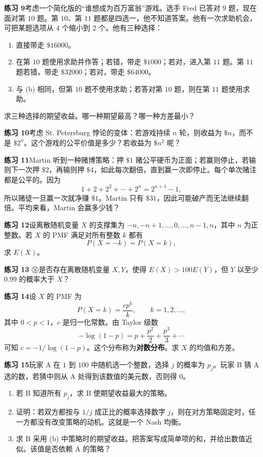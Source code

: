 \documentclass[UTF8, 12pt, fontset=fandol, oneside]{ctexart}
\begin{document}
\noindent\textbf{练习 9}\quad 考虑一个简化版的“谁想成为百万富翁”游戏。选手 Fred 已答对 $9$ 题，现在面对第 $10$ 题。第 $10$、第 $11$ 题都是四选一，他不知道答案。他有一次求助机会，可把某题选项从 $4$ 个缩小到 $2$ 个。他有三种选择：
\begin{enumerate}
  \item[(a)] 直接带走 $\$16000$。
  \item[(b)] 在第 $10$ 题使用求助并作答；若错，带走 $\$1000$；若对，进入第 $11$ 题。第 $11$ 题若错，带走 $\$32000$；若对，带走 $\$64000$。
  \item[(c)] 与 (b) 相同，但第 $10$ 题不使用求助；若答对第 $10$ 题，则在第 $11$ 题使用求助。
\end{enumerate}
求三种选择的期望收益。哪一种期望最高？哪一种方差最小？

\noindent\textbf{练习 10}\quad 考虑 St. Petersburg 悖论的变体：若游戏持续 $n$ 轮，则收益为 $\$n$，而不是 $\$2^n$。这个游戏的公平价值是多少？若收益为 $\$n^2$ 呢？

\noindent\textbf{练习 11}\quad Martin 听到一种赌博策略：押 $\$1$ 赌公平硬币为正面；若赢则停止，若输则下一次押 $\$2$，再输则押 $\$4$，如此每次翻倍，直到赢一次即停止。每个单次赌注都是公平的。因为
\[
  1+2+2^2+\cdots+2^n=2^{n+1}-1,
\]
所以赌徒一旦赢一次就净赚 $\$1$。Martin 只有 $\$31$，因此可能破产而无法继续翻倍。平均来看，Martin 会赢多少钱？

\noindent\textbf{练习 12}\quad 设离散随机变量 $X$ 的支撑集为 $-n,-n+1,\ldots,0,\ldots,n-1,n$，其中 $n$ 为正整数。若 $X$ 的 PMF 满足对所有整数 $k$ 都有
\[
  P(X=-k)=P(X=k),
\]
求 $E(X)$。

\noindent\textbf{练习 13 $\circledS$}\quad 是否存在离散随机变量 $X,Y$，使得 $E(X)>100E(Y)$，但 $Y$ 以至少 $0.99$ 的概率大于 $X$？

\noindent\textbf{练习 14}\quad 设 $X$ 的 PMF 为
\[
  P(X=k)=\frac{cp^k}{k},\qquad k=1,2,\ldots,
\]
其中 $0<p<1$，$c$ 是归一化常数。由 Taylor 级数
\[
  -\log(1-p)=p+\frac{p^2}{2}+\frac{p^3}{3}+\cdots
\]
可知 $c=-1/\log(1-p)$。这个分布称为\textbf{对数分布}。求 $X$ 的均值和方差。

\noindent\textbf{练习 15}\quad 玩家 A 在 $1$ 到 $100$ 中随机选一个整数，选择 $j$ 的概率为 $p_j$。玩家 B 猜 A 选的数，若猜中则从 A 处得到该数值的美元数，否则得 $0$。
\begin{enumerate}
  \item[(a)] 若 B 知道所有 $p_j$，求 B 使期望收益最大的策略。
  \item[(b)] 证明：若双方都按与 $1/j$ 成正比的概率选择数字 $j$，则在对方策略固定时，任一方都没有改变策略的动机。这就是一个 Nash 均衡。
  \item[(c)] 求 B 采用 (b) 中策略时的期望收益。把答案写成简单项的和，并给出数值近似。该值是否依赖 A 的策略？
\end{enumerate}
\end{document}

